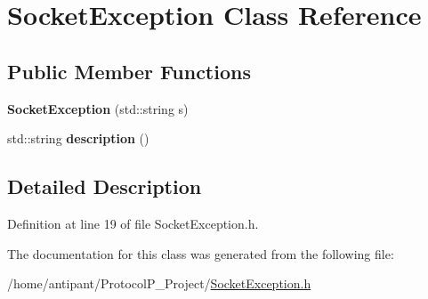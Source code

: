 \hypertarget{classSocketException}{\section{Socket\-Exception Class Reference}
\label{classSocketException}
}
\subsection*{Public Member Functions}
\begin{DoxyCompactItemize}
\item 
\hypertarget{classSocketException_a09ddb0c061c40fcb527ff89a2e803342}{{\bfseries Socket\-Exception} (std\-::string s)}\label{classSocketException_a09ddb0c061c40fcb527ff89a2e803342}

\item 
\hypertarget{classSocketException_ad7920caebddc99b6bbb7dbede569fa18}{std\-::string {\bfseries description} ()}\label{classSocketException_ad7920caebddc99b6bbb7dbede569fa18}

\end{DoxyCompactItemize}


\subsection{Detailed Description}


Definition at line 19 of file Socket\-Exception.\-h.



The documentation for this class was generated from the following file\-:\begin{DoxyCompactItemize}
\item 
/home/antipant/\-Protocol\-P\-\_\-\-Project/\hyperlink{SocketException_8h}{Socket\-Exception.\-h}\end{DoxyCompactItemize}
